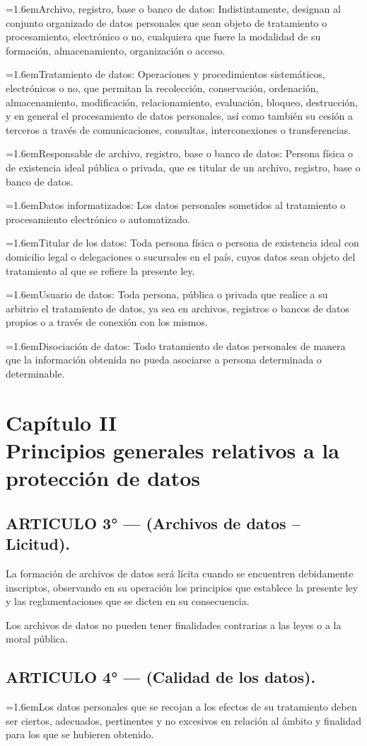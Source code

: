 \documentclass[10pt,a4paper]{article}
\newcommand{\capitulo}[2]{\section[#1 --- #2]{#1\\[2pt]#2}}
\newcommand{\articulo}[1]{\subsection{#1}}
\newcommand{\inciso}[2]{\par{\hangindent=1.6em\hangafter=1\makebox[1.6em][l]{#1}#2\par}}
\begin{document}
\inciso{—}{Archivo, registro, base o banco de datos: Indistintamente, designan al conjunto organizado de datos personales que sean objeto de tratamiento o procesamiento, electrónico o no, cualquiera que fuere la modalidad de su formación, almacenamiento, organización o acceso.}

\inciso{—}{Tratamiento de datos: Operaciones y procedimientos sistemáticos, electrónicos o no, que permitan la recolección, conservación, ordenación, almacenamiento, modificación, relacionamiento, evaluación, bloqueo, destrucción, y en general el procesamiento de datos personales, así como también su cesión a terceros a través de comunicaciones, consultas, interconexiones o transferencias.}

\inciso{—}{Responsable de archivo, registro, base o banco de datos: Persona física o de existencia ideal pública o privada, que es titular de un archivo, registro, base o banco de datos.}

\inciso{—}{Datos informatizados: Los datos personales sometidos al tratamiento o procesamiento electrónico o automatizado.}

\inciso{—}{Titular de los datos: Toda persona física o persona de existencia ideal con domicilio legal o delegaciones o sucursales en el país, cuyos datos sean objeto del tratamiento al que se refiere la presente ley.}

\inciso{—}{Usuario de datos: Toda persona, pública o privada que realice a su arbitrio el tratamiento de datos, ya sea en archivos, registros o bancos de datos propios o a través de conexión con los mismos.}

\inciso{—}{Disociación de datos: Todo tratamiento de datos personales de manera que la información obtenida no pueda asociarse a persona determinada o determinable.}

\capitulo{Capítulo II}{Principios generales relativos a la protección de datos}
\articulo{ARTICULO 3° — (Archivos de datos – Licitud).}
La formación de archivos de datos será lícita cuando se encuentren debidamente inscriptos, observando en su operación los principios que establece la presente ley y las reglamentaciones que se dicten en su consecuencia.

Los archivos de datos no pueden tener finalidades contrarias a las leyes o a la moral pública.

\articulo{ARTICULO 4° — (Calidad de los datos).}
\inciso{1.}{Los datos personales que se recojan a los efectos de su tratamiento deben ser ciertos, adecuados, pertinentes y no excesivos en relación al ámbito y finalidad para los que se hubieren obtenido.}
\end{document}
